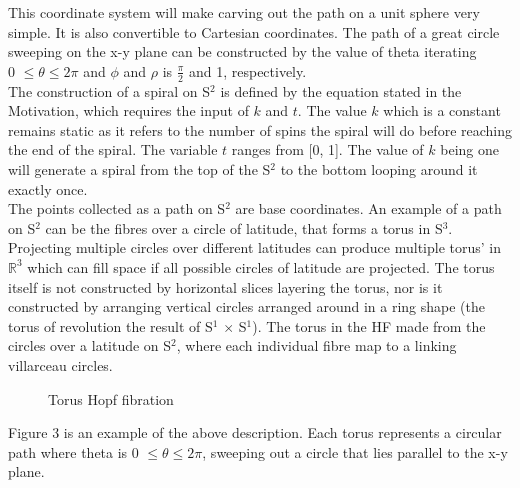 \documentclass[12pt]{article} %
\begin{document}
\begin{flushleft}
This coordinate system will make carving out the path on a unit sphere very simple. It is also convertible to Cartesian coordinates. The path of a great circle sweeping on the x-y plane can be constructed by the value of theta iterating\\ 0 $\leq\theta\leq 2\pi$ and $\phi$ and $\rho$ is $\frac{\pi}{2}$ and 1, respectively.\\
The construction of a spiral on S$^{2}$ is defined by the equation stated in the Motivation, which requires the input of $k$ and $t$. The value $k$ which is a constant remains static as it refers to the number of spins the spiral will do before reaching the end of the spiral. The variable $t$ ranges from [0, 1]. The value of $k$ being one will generate a spiral from the top of the S$^{2}$ to the bottom looping around it exactly once. \\
The points collected as a path on S$^{2}$ are base coordinates. An example of a path on S$^{2}$ can be the fibres over a circle of latitude, that forms a torus in S$^{3}$. Projecting multiple circles over different latitudes can produce multiple torus’ in $\mathbb{R}^{3}$ which can fill space if all possible circles of latitude are projected. The torus itself is not constructed by horizontal slices layering the torus, nor is it constructed by arranging vertical circles arranged around in a ring shape (the torus of revolution the result of S$^{1}$ $\times$ S$^{1}$). The torus in the HF made from the circles over a latitude on S$^{2}$, where each individual fibre map to a linking villarceau circles.\\

\begin{figure}[H] %
\caption{Torus Hopf fibration \cite{Connellan:2014dg}}
\label{fig:speciation}
\end{figure}

Figure 3 is an example of the above description. Each torus represents a circular path where theta is 0 $\leq\theta\leq 2\pi$, sweeping out a circle that lies parallel to the x-y plane.\\


\end{flushleft}
\end{document}
